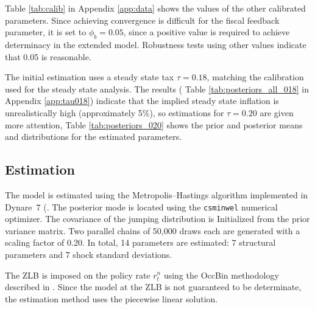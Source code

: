 \documentclass[]{article}
\begin{document}
Table \ref{tab:calib} in Appendix \ref{app:data} shows the values of the other calibrated parameters. Since achieving convergence is difficult for the fiscal feedback parameter, it is set to $\phi_{b}=0.05$, since a positive value is required to achieve determinacy in the extended model. Robustness tests using other values indicate that 0.05 is reasonable.

The initial estimation uses a steady state tax $\tau=0.18$, matching the calibration used for the steady state analysis. The results ( Table \ref{tab:posteriors_all_018} in Appendix \ref{app:tau018}) indicate that the implied steady state inflation is unrealistically high (approximately 5\%), so estimations for $\tau=0.20$ are given more attention, Table \ref{tab:posteriors_020} shows the prior and posterior means and distributions for the estimated parameters.

\subsection{Estimation}

The model is estimated using the Metropolis--Hastings algorithm implemented in Dynare~7 (\textcite{adjemian2011dynare}.  The posterior mode is located using the \texttt{csminwel} numerical optimizer.  The covariance of the jumping distribution is Initialized from the prior variance matrix.  Two parallel chains of 50,000 draws each are generated with a scaling factor of 0.20.  In total, 14 parameters are estimated: 7 structural parameters and 7 shock standard deviations.

The ZLB is imposed on the policy rate $r^{n}_{t}$ using the OccBin methodology described in \textcite{GuerrieriIacoviello2015}. Since the model at the ZLB is not guaranteed to be determinate, the estimation method uses the piecewise linear solution.
\end{document}
